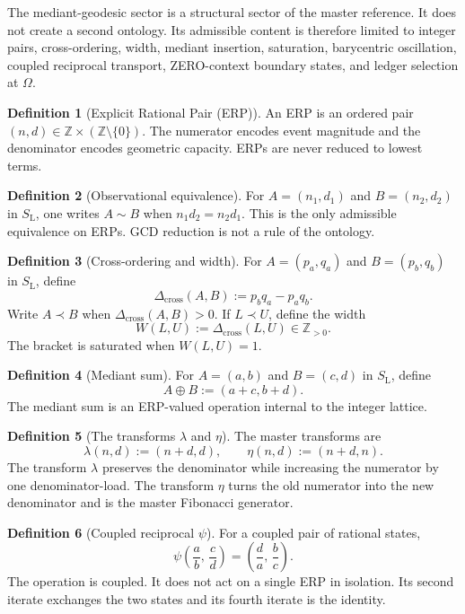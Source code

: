 \documentclass[11pt, letterpaper]{article}
\newcommand{\Z}{\mathbb{Z}}
\newcommand{\SL}{S_{\mathrm{L}}}
\newcommand{\lop}{\lambda}
\newcommand{\aop}{\eta}
\newcommand{\med}{\oplus}
\newcommand{\Dcross}{\Delta_{\mathrm{cross}}}
\theoremstyle{definition}
\newtheorem{definition}{Definition}[section]
\theoremstyle{plain}
\begin{document}
\begin{rsbox}
The mediant-geodesic sector is a structural sector of the master reference.  It
does not create a second ontology.  Its admissible content is therefore limited
to integer pairs, cross-ordering, width, mediant insertion, saturation,
barycentric oscillation, coupled reciprocal transport, ZERO-context boundary
states, and ledger selection at $\Omega$.
\end{rsbox}

\begin{definition}[Explicit Rational Pair (ERP)]
An ERP is an ordered pair $(n,d)\in\Z\times(\Z\setminus\{0\})$.  The numerator
encodes event magnitude and the denominator encodes geometric capacity.  ERPs
are never reduced to lowest terms.
\end{definition}

\begin{definition}[Observational equivalence]
For $A=(n_1,d_1)$ and $B=(n_2,d_2)$ in $\SL$, one writes $A\sim B$ when
$n_1 d_2=n_2 d_1$.  This is the only admissible equivalence on ERPs.  GCD
reduction is not a rule of the ontology.
\end{definition}

\begin{definition}[Cross-ordering and width]
For $A=(p_a,q_a)$ and $B=(p_b,q_b)$ in $\SL$, define
\[
\Dcross(A,B):=p_b q_a-p_a q_b.
\]
Write $A\prec B$ when $\Dcross(A,B)>0$.  If $L\prec U$, define the width
\[
W(L,U):=\Dcross(L,U)\in\Z_{>0}.
\]
The bracket is saturated when $W(L,U)=1$.
\end{definition}

\begin{definition}[Mediant sum]
For $A=(a,b)$ and $B=(c,d)$ in $\SL$, define
\[
A\med B:=(a+c,b+d).
\]
The mediant sum is an ERP-valued operation internal to the integer lattice.
\end{definition}

\begin{definition}[The transforms $\lop$ and $\aop$]
The master transforms are
\[
\lop(n,d):=(n+d,d),
\qquad
\aop(n,d):=(n+d,n).
\]
The transform $\lop$ preserves the denominator while increasing the numerator
by one denominator-load.  The transform $\aop$ turns the old numerator into the
new denominator and is the master Fibonacci generator.
\end{definition}

\begin{definition}[Coupled reciprocal $\psi$]
For a coupled pair of rational states,
\[
\psi\!\left(\frac{a}{b},\,\frac{c}{d}\right)
=
\left(\frac{d}{a},\,\frac{b}{c}\right).
\]
The operation is coupled.  It does not act on a single ERP in isolation.  Its
second iterate exchanges the two states and its fourth iterate is the identity.
\end{definition}
\end{document}
